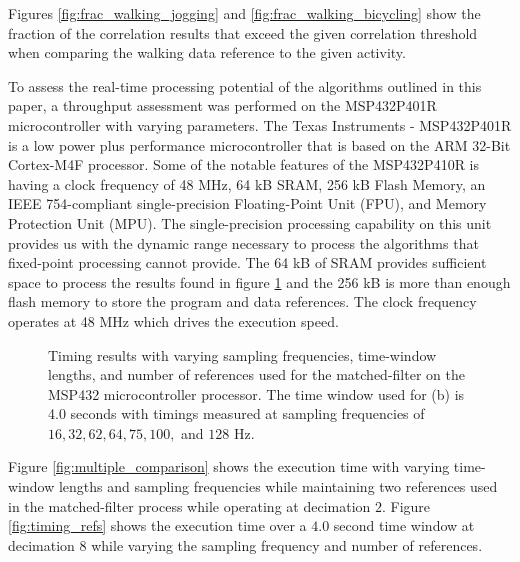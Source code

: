 \documentclass{sciposter}
\begin{document}
\begin{multicols}{3}
Figures \ref{fig:frac_walking_jogging} and \ref{fig:frac_walking_bicycling} show the fraction of the correlation results that exceed the given correlation threshold when comparing the walking data reference to the given activity.

To assess the real-time processing potential of the algorithms outlined in this paper, a throughput assessment was performed on the MSP432P401R microcontroller with varying parameters.
The Texas Instruments - MSP432P401R is a low power plus performance microcontroller that is based on the ARM 32-Bit Cortex-M4F processor.
Some of the notable features of the MSP432P410R is having a clock frequency of 48 MHz, 64 kB SRAM, 256 kB Flash Memory, an IEEE 754-compliant single-precision Floating-Point Unit (FPU), and Memory Protection Unit (MPU).
The single-precision processing capability on this unit provides us with the dynamic range necessary to process the algorithms that fixed-point processing cannot provide.
The 64 kB of SRAM provides sufficient space to process the results found in figure \ref{fig:timing} and
the 256 kB is more than enough flash memory to store the program and data references.
The clock frequency operates at 48 MHz which drives the execution speed.

\begin{figure}[!ht]
\centering
{}
\caption{Timing results with varying sampling frequencies, time-window lengths, and number of references used for the matched-filter on the MSP432 microcontroller processor. The time window used for (b) is 4.0 seconds with timings measured at sampling frequencies of $16, 32, 62, 64, 75, 100,$ and $128$ Hz.}
\label{fig:timing}
\end{figure}
%
Figure \ref{fig:multiple_comparison} shows the execution time with varying time-window lengths and sampling frequencies while maintaining two references used in the matched-filter process while operating at decimation $2$.
Figure \ref{fig:timing_refs} shows the execution time over a $4.0$ second time window at decimation $8$ while varying the sampling frequency and number of references.


\end{multicols}
\end{document}
